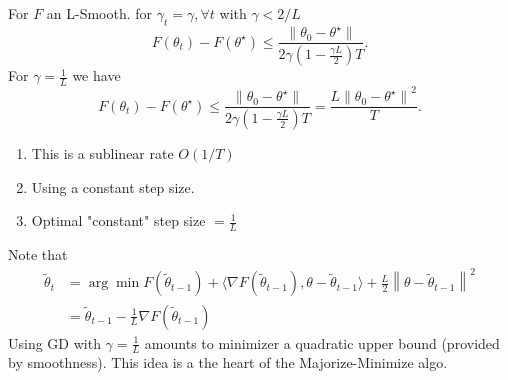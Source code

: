 \begin{thm}[]
    For $ F $ an L-Smooth. for $ \gamma _t = \gamma , \forall t $ with $ \gamma < 2/L $ 
    \[
        F(\theta _t) - F(\theta ^\star ) \leq \frac{\left\| \theta _0 - \theta 
        ^\star  \right\| }{2 \gamma (1 - \frac{\gamma L}{2}) T }
    .\]
    For $ \gamma = \frac{1}{L} $ we have 
    \[
        F(\theta _t) - F(\theta ^\star ) \leq \frac{\left\| \theta _0 - \theta ^\star  \right\| }{2 \gamma (1 - \frac{\gamma L}{2}) T } = \frac{L \left\| \theta _0 - \theta ^\star  \right\| ^2}{T}
    .\]

    \begin{note}[]
        \begin{enumerate}
            \item This is a sublinear rate $ O(1/T) $
            \item Using a constant step size. \\
            \item Optimal "constant" step size $ = \frac{1}{L} $ 
        \end{enumerate}
    \end{note}

    \begin{note}[Interpolation of GD with $ \gamma = \frac{1}{L} $ ]
        Note that \begin{align*}
            \tilde{\theta }_t 
                &= \arg \min F(\tilde{\theta }_{t-1}) + \langle \nabla F(\tilde{\theta } _{t-1}), \theta  - \tilde{\theta }_{t-1} \rangle + \frac{L}{2} \left\| \theta  - \tilde{\theta }_{t - 1} \right\| ^2 \\
                &= \tilde{\theta }_{t - 1} - \frac{1}{L} \nabla F(\tilde{\theta }_{t - 1})
        \end{align*}
        Using GD with $ \gamma = \frac{1}{L} $ amounts to minimizer a quadratic upper bound (provided by smoothness). This idea is a the heart of the Majorize-Minimize algo. 
    \end{note}
\end{thm}

